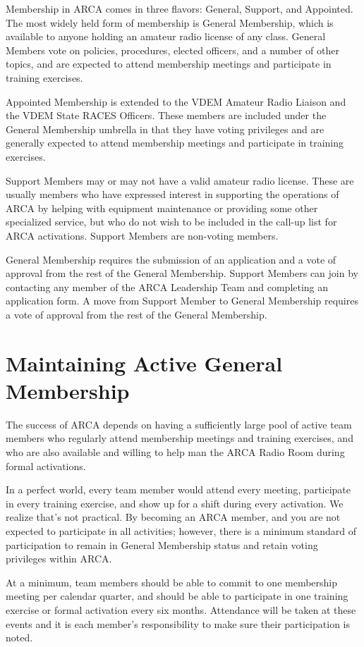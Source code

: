 \documentclass[pdflatex,letterpaper,twoside,12pt]{book}
\begin{document}
Membership in ARCA comes in three flavors:  General, Support, and Appointed.  The most widely held form of membership is General Membership, which is available to anyone holding an amateur radio license of any class.  General Members vote on policies, procedures, elected officers, and a number of other topics, and are expected to attend membership meetings and participate in training exercises.

Appointed Membership is extended to the VDEM Amateur Radio Liaison and the VDEM State RACES Officers.  These members are included under the General Membership umbrella in that they have voting privileges and are generally expected to attend membership meetings and participate in training exercises.

Support Members may or may not have a valid amateur radio license.  These are usually members who have expressed interest in supporting the operations of ARCA by helping with equipment maintenance or providing some other specialized service, but who do not wish to be included in the call-up list for ARCA activations.  Support Members are non-voting members.

General Membership requires the submission of an application and a vote of approval from the rest of the General Membership.  Support Members can join by contacting any member of the ARCA Leadership Team and completing an application form.  A move from Support Member to General Membership requires a vote of approval from the rest of the General Membership.

\section{Maintaining Active General Membership}

The success of ARCA depends on having a sufficiently large pool of active team members who regularly attend membership meetings and training exercises, and who are also available and willing to help man the ARCA Radio Room during formal activations.

In a perfect world, every team member would attend every meeting, participate in every training exercise, and show up for a shift during every activation.  We realize that's not practical.  By becoming an ARCA member, and you are not expected to participate in all activities; however, there is a minimum standard of participation to remain in General Membership status and retain voting privileges within ARCA.

At a minimum, team members should be able to commit to one membership meeting per calendar quarter, and should be able to participate in one training exercise or formal activation every six months.  Attendance will be taken at these events and it is each member's responsibility to make sure their participation is noted.
\end{document}
